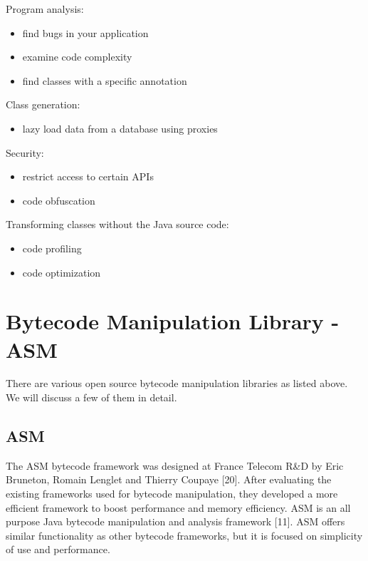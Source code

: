 Program analysis:
\begin{itemize}
\item find bugs in your application
\item examine code complexity
\item find classes with a specific annotation
\end{itemize}

Class generation:
\begin{itemize}
\item lazy load data from a database using proxies
\end{itemize}

Security:
\begin{itemize}
\item restrict access to certain APIs
\item code obfuscation
\end{itemize}

Transforming classes without the Java source code:
\begin{itemize}
\item code profiling
\item code optimization
\end{itemize}

\section{Bytecode Manipulation Library - ASM}
There are various open source bytecode manipulation libraries as listed above. We will discuss a few of them in detail.

\subsection{ASM}
The ASM bytecode framework was designed at France Telecom R\&D by Eric Bruneton, Romain Lenglet and Thierry Coupaye [20]. After evaluating the existing frameworks used for bytecode manipulation, they developed a more efficient framework to boost performance and memory efficiency. ASM is an all purpose Java bytecode manipulation and analysis framework [11]. ASM offers similar functionality as other bytecode frameworks, but it is focused on simplicity of use and performance.

